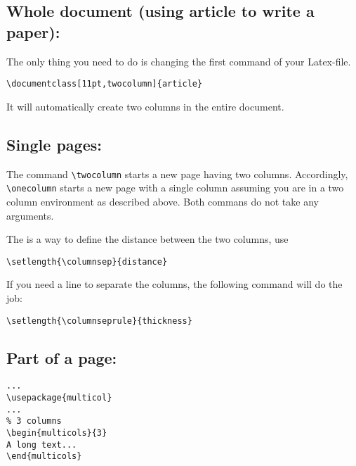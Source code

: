 \subsection{Whole document (using article to write a paper):}

The only thing you need to do is changing the first command of your Latex-file.

\begin{verbatim}
\documentclass[11pt,twocolumn]{article}
\end{verbatim}

It will automatically create two columns in the entire document.

\subsection{Single pages:}

The command \verb|\twocolumn| starts a new page having two columns. Accordingly, \verb|\onecolumn| starts a new page with a single column assuming you are in a two column environment as described above. Both commans do not take any arguments.

The is a way to define the distance between the two columns, use

\begin{verbatim}
\setlength{\columnsep}{distance}
\end{verbatim}

If you need a line to separate the columns, the following command will do the job:

\begin{verbatim}
\setlength{\columnseprule}{thickness}
\end{verbatim}

\subsection{Part of a page:}

\begin{verbatim}
...
\usepackage{multicol}
...
% 3 columns
\begin{multicols}{3}    
A long text...
\end{multicols}
\end{verbatim}

